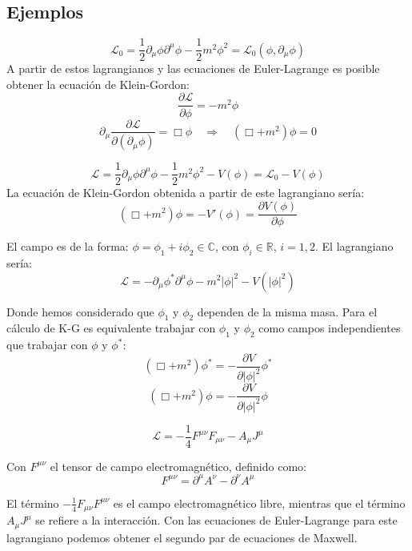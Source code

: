 \subsection{Ejemplos}

\begin{example}
  $$
  \mathcal{L}_0 = \frac{1}{2} \partial_\mu \phi \partial^\mu \phi - \frac{1}{2} m^2 \phi^2 = \mathcal{L}_0 (\phi, \partial_\mu \phi)
  $$
  A partir de estos lagrangianos y las ecuaciones de Euler-Lagrange es posible obtener la ecuación de Klein-Gordon:
  $$
  \frac{\partial \mathcal{L}}{\partial \phi} = -m^2 \phi
  $$
  $$
  \partial_\mu \frac{\partial \mathcal{L}}{\partial (\partial_\mu \phi)} = \Box \phi \quad \Rightarrow \quad (\Box + m^2) \phi = 0
  $$

\end{example}
\begin{example}

  $$
    \mathcal{L} = \frac{1}{2} \partial_\mu \phi \partial^\mu \phi - \frac{1}{2} m^2 \phi^2 - V(\phi) = \mathcal{L}_0 - V(\phi)
    $$
    La ecuación de Klein-Gordon obtenida a partir de este lagrangiano sería:
    $$
    (\Box + m^2) \phi = -V'(\phi) = \frac{\partial V(\phi)}{\partial \phi}
    $$
  
\end{example}
\begin{example}
  El campo es de la forma: $\phi = \phi_1 + i \phi_2 \in \mathbb{C}$, con $\phi_i \in \mathbb{R}$, $i = 1, 2$. El lagrangiano sería:
  $$
  \mathcal{L} = -\partial_\mu \phi^* \partial^\mu \phi - m^2 |\phi|^2 - V(|\phi|^2)
  $$

  Donde hemos considerado que $\phi_1$ y $\phi_2$ dependen de la misma masa. Para el cálculo de K-G es equivalente trabajar con $\phi_1$ y $\phi_2$ como campos independientes que trabajar con $\phi$ y $\phi^*$:
  $$
  (\Box + m^2) \phi^* = -\frac{\partial V}{\partial |\phi|^2} \phi^*
  $$
  $$
  (\Box + m^2) \phi = -\frac{\partial V}{\partial |\phi|^2} \phi
  $$
\end{example}
\begin{example}
  $$
    \mathcal{L} = -\frac{1}{4} F^{\mu\nu} F_{\mu\nu} - A_\mu J^\mu
    $$

    Con $F^{\mu\nu}$ el tensor de campo electromagnético, definido como:
    $$
    F^{\mu\nu} = \partial^\mu A^\nu - \partial^\nu A^\mu
    $$

    El término $-\frac{1}{4} F_{\mu\nu} F^{\mu\nu}$ es el campo electromagnético libre, mientras que el término $A_\mu J^\mu$ se refiere a la interacción. Con las ecuaciones de Euler-Lagrange para este lagrangiano podemos obtener el segundo par de ecuaciones de Maxwell.
\end{example}
